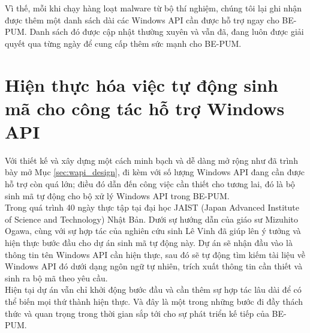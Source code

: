 Vì thế, mỗi khi chạy hàng loạt malware từ bộ thí nghiệm, chúng tôi lại ghi nhận được thêm một danh sách dài các Windows API cần được hỗ trợ ngay cho BE-PUM. Danh sách đó được cập nhật thường xuyên và vẫn đã, đang luôn được giải quyết qua từng ngày để cung cấp thêm sức mạnh cho BE-PUM.

\section{Hiện thực hóa việc tự động sinh mã cho công tác hỗ trợ Windows API}

Với thiết kế và xây dựng một cách minh bạch và dễ dàng mở rộng như đã trình bày mở Mục \ref{sec:wapi_design}, đi kèm với số lượng Windows API đang cần được hỗ trợ còn quá lớn; điều đó dẫn đến công việc cần thiết cho tương lai, đó là bộ sinh mã tự động cho bộ xử lý Windows API trong BE-PUM.\\

Trong quá trình 40 ngày thực tập tại đại học JAIST (Japan Advanced Institute of Science and Technology) Nhật Bản. Dưới sự hướng dẫn của giáo sư Mizuhito Ogawa, cùng với sự hợp tác của nghiên cứu sinh Lê Vinh đã giúp lên ý tưởng và hiện thực bước đầu cho dự án sinh mã tự động này. Dự án sẽ nhận đầu vào là thông tin tên Windows API cần hiện thực, sau đó sẽ tự động tìm kiếm tài liệu về Windows API đó dưới dạng ngôn ngữ tự nhiên, trích xuất thông tin cần thiết và sinh ra bộ mã theo yêu cầu.\\

Hiện tại dự án vẫn chỉ khởi động bước đầu và cần thêm sự hợp tác lâu dài để có thể biến mọi thứ thành hiện thực. Và đây là một trong những bước đi đầy thách thức và quan trọng trong thời gian sắp tới cho sự phát triển kế tiếp của BE-PUM.